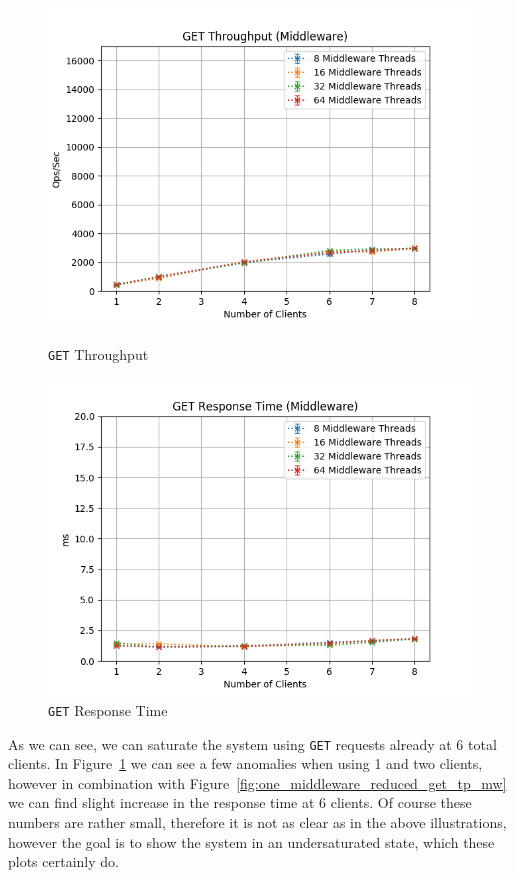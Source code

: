 \documentclass[11pt,a4paper]{article}
\begin{document}
\begin{figure}[H]
	\centering
	\captionsetup{width=0.4\textwidth}
    \begin{minipage}{0.5\textwidth}
        \centering
        \includegraphics[width=\textwidth]{../illustrations/plots/2_1_1_one_middleware_reduced/0-1/middleware_get_tp_s.png}
        \caption{\texttt{GET} Throughput}
        \label{fig:one_middleware_reduced_get_tp_mw}
    \end{minipage}\hfill
    \begin{minipage}{0.5\textwidth}
        \centering
        \includegraphics[width=\textwidth]{../illustrations/plots/2_1_1_one_middleware_reduced/0-1/middleware_get_rt_ms.png}
        \caption{\texttt{GET} Response Time}
        \label{fig:one_middleware_reduced_get_rt_mw}
    \end{minipage}
\end{figure}
%
As we can see, we can saturate the system using \texttt{GET} requests already at 6 total clients.
%
In Figure~\ref{fig:one_middleware_reduced_get_rt_mw} we can see a few anomalies when using 1 and two clients, however in combination with Figure~\ref{fig:one_middleware_reduced_get_tp_mw} we can find slight increase in the response time at 6 clients.
%
Of course these numbers are rather small, therefore it is not as clear as in the above illustrations, however the goal is to show the system in an undersaturated state, which these plots certainly do.
%
\end{document}
